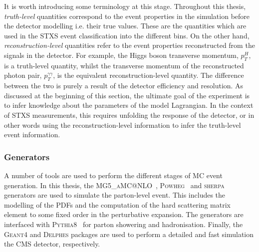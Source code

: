 It is worth introducing some terminology at this stage. Throughout this thesis, \textit{truth-level} quantities correspond to the event properties in the simulation before the detector modelling i.e. their true values. These are the quantities which are used in the STXS event classification into the different bins. On the other hand, \textit{reconstruction-level} quantities refer to the event properties reconstructed from the signals in the detector. For example, the Higgs boson transverse momentum, $p_T^H$, is a truth-level quantity, whilst the transverse momentum of the reconstructed photon pair, $p_T^{\gamma\gamma}$, is the equivalent reconstruction-level quantity. The difference between the two is purely a result of the detector efficiency and resolution. As discussed at the beginning of this section, the ultimate goal of the experiment is to infer knowledge about the parameters of the model Lagrangian. In the context of STXS measurements, this requires unfolding the response of the detector, or in other words using the reconstruction-level information to infer the truth-level event information.

\subsubsection{Generators}
A number of tools are used to perform the different stages of MC event generation. In this thesis, the \textsc{MG5\_aMC@NLO}~\cite{Alwall:2014hca}, \textsc{Powheg}~\cite{Nason:2004rx,Frixione:2007vw,Alioli:2008tz,Nason:2009ai,Alioli:2010xd,Hartanto:2015uka} and \textsc{sherpa}~\cite{Gleisberg:2008ta} generators are used to simulate the parton-level event. This includes the modelling of the PDFs and the computation of the hard scattering matrix element to some fixed order in the perturbative expansion. The generators are interfaced with \textsc{Pythia8}~\cite{Sjostrand:2014zea} for parton showering and hadronisation. Finally, the \textsc{Geant4} and \textsc{Delphes} packages are used to perform a detailed and fast simulation the CMS detector, respectively.



